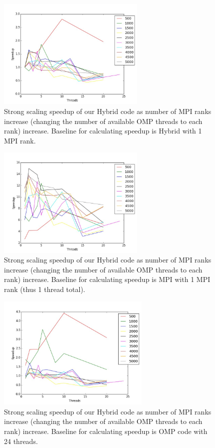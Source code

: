 \begin{figure}[h]
  \centering
  \includegraphics[width=0.63\textwidth] {plots/3}
  \caption{%
    Strong scaling speedup of our Hybrid code as number of MPI ranks increase
    (changing the number of available OMP threads to each rank) increase.
    Baseline for calculating speedup is Hybrid with 1 MPI rank.
  }
  \label{aload0}
\end{figure}
\begin{figure}[h]
  \centering
  \includegraphics[width=0.63\textwidth] {plots/4}
  \caption{%
    Strong scaling speedup of our Hybrid code as number of MPI ranks increase
    (changing the number of available OMP threads to each rank) increase.
    Baseline for calculating speedup is MPI with 1 MPI rank (thus 1 thread
    total).
  }
  \label{aload1}
\end{figure}

\begin{figure}[h]
  \centering
  \includegraphics[width=0.65\textwidth]{plots/5}
  \caption{%
    Strong scaling speedup of our Hybrid code as number of MPI ranks increase
    (changing the number of available OMP threads to each rank) increase.
    Baseline for calculating speedup is OMP code with 24 threads.
  }
\end{figure}

